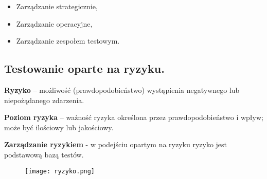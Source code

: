 \documentclass[../main.tex]{subfiles}
\begin{document}
    \begin{itemize}
        \item Zarządzanie strategicznie,
        \item Zarządzanie operacyjne,
        \item Zarządzanie zespołem testowym.
    \end{itemize}

    \subsection{Testowanie oparte na ryzyku.}

    \textbf{Ryzyko} – możliwość (prawdopodobieństwo) wystąpienia negatywnego lub niepożądanego zdarzenia.

    \textbf{Poziom ryzyka} – ważność ryzyka określona przez prawdopodobieństwo i wpływ; może być ilościowy lub
    jakościowy.

    \textbf{Zarządzanie ryzykiem} - w podejściu opartym na ryzyku ryzyko jest podstawową bazą testów.

    \begin{figure}[H]
        \texttt{[image: ryzyko.png]}
    \end{figure}
\end{document}
